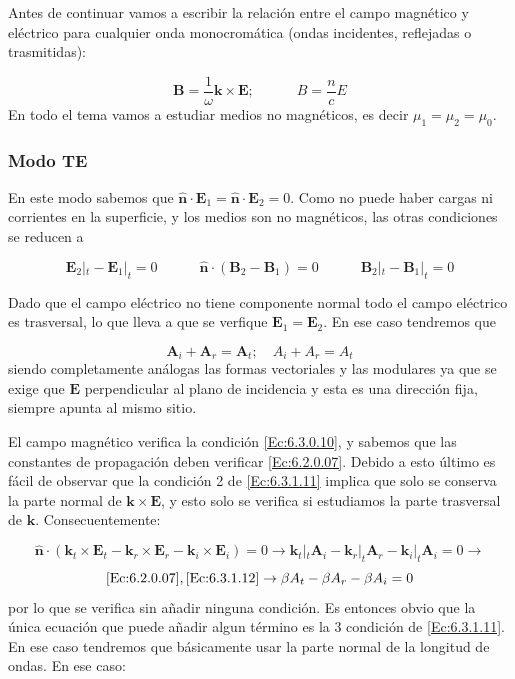 \documentclass[12pt]{article}
\newcommand{\tquad}{\quad \quad \quad}
\newcommand{\Bn}{\mathbf{B}}
\newcommand{\En}{\mathbf{E}}
\newcommand{\kn}{\mathbf{k}}
\newcommand{\An}{\mathbf{A}}
\newcommand{\hnn}{\hat{\mathbf{n}}}
\numberwithin{equation}{section}
\numberwithin{figure}{section}
\begin{document}
Antes de continuar vamos a escribir la relación entre el campo magnético y eléctrico para cualquier onda monocromática (ondas incidentes, reflejadas o trasmitidas):

\begin{equation}
\Bn = \dfrac{1}{\omega} \kn \times \En; \tquad B = \dfrac{n}{c} E \label{Ec:6.3.0.10} 
\end{equation}
En todo el tema vamos a estudiar medios no magnéticos, es decir $\mu_1 = \mu_2 = \mu_0$.

\subsubsection{Modo TE}

En este modo sabemos que $\hnn \cdot \En_1 = \hnn \cdot \En_2 =0$. Como no puede haber cargas ni corrientes en la superficie, y los medios son no magnéticos, las otras condiciones se reducen a

\begin{equation}
 \En_{2} |_t -\En_{1} |_t =0 \tquad
\hnn \cdot (\Bn_2-\Bn_1)=0   \tquad \Bn_{2} |_t  - \Bn_{1} |_t = 0  \label{Ec:6.3.1.11} 
\end{equation}

Dado que el campo eléctrico no tiene componente normal todo el campo eléctrico es trasversal, lo que lleva a que se verfique $\En_1 = \En_2$. En ese caso tendremos que

\begin{equation}
\An_i  + \An_r = \An_t; \quad A_i + A_r = A_t  \label{Ec:6.3.1.12} 
\end{equation} 
siendo completamente análogas las formas vectoriales y las modulares ya que se exige que $\En$ perpendicular al plano de incidencia y esta es una dirección fija, siempre apunta al mismo sitio.
 
El campo magnético verifica la condición \ref{Ec:6.3.0.10}, y sabemos que las constantes de propagación deben verificar \ref{Ec:6.2.0.07}. Debido a esto último es fácil de observar que la condición 2 de \ref{Ec:6.3.1.11} implica que solo se conserva la parte normal de $\kn \times \En$, y esto solo se  verifica si estudiamos la parte trasversal de $\kn$. Consecuentemente:

$$  \hnn \cdot (\kn_t \times \En_t -  \kn_r \times \En_r - \kn_i \times \En_i ) = 0    \longrightarrow   \kn_t |_t  \An_i - \kn_r |_t \An_r - \kn_i |_t \An_i = 0 \longrightarrow $$
$$ \eqref{Ec:6.2.0.07}, \eqref{Ec:6.3.1.12} \rightarrow  \beta  A_t - \beta A_r - \beta A_i = 0  $$
por lo que se verifica sin añadir ninguna condición. Es entonces obvio que la única ecuación que puede añadir algun término es la 3 condición de \ref{Ec:6.3.1.11}. En ese caso tendremos que básicamente usar la parte normal de la longitud de ondas. En ese caso:
\end{document}
